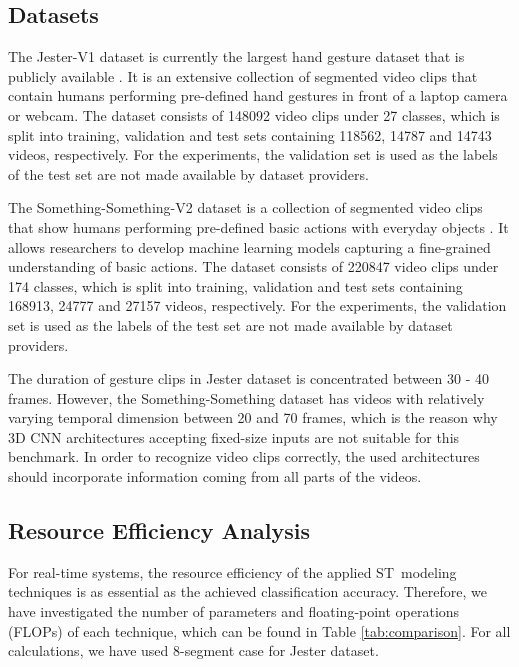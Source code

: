 \documentclass[runningheads]{llncs}
\begin{document}
\subsection{Datasets}

The Jester-V1 dataset is currently the largest hand gesture dataset that is publicly available \cite{jester}. It is an extensive collection of segmented video clips that contain humans performing pre-defined hand gestures in front of a laptop camera or webcam. The dataset consists of 148092 video clips under 27 classes, which is split into training, validation and test sets containing 118562, 14787 and 14743 videos, respectively. For the experiments, the validation set is used as the labels of the test set are not made available by dataset providers.

The Something-Something-V2 dataset is a collection of segmented video clips that show humans performing pre-defined basic actions with everyday objects \cite{Goyal_undated-kx}. It allows researchers to develop machine learning models capturing a fine-grained understanding of basic actions. The dataset consists of 220847 video clips under 174 classes, which is split into training, validation and test sets containing 168913, 24777 and 27157 videos, respectively. For the experiments, the validation set is used as the labels of the test set are not made available by dataset providers.

The duration of gesture clips in Jester dataset is concentrated between 30 - 40 frames. However, the Something-Something dataset has videos with relatively varying temporal dimension between 20 and 70 frames, which is the reason why 3D CNN architectures accepting fixed-size inputs are not suitable for this benchmark. In order to recognize video clips correctly, the used architectures should incorporate information coming from all parts of the videos.


\subsection{Resource Efficiency Analysis}

For real-time systems, the resource efficiency of the applied ST~modeling techniques is as essential as the achieved classification accuracy. Therefore, we have investigated the number of parameters and floating-point operations (FLOPs) of each technique, which can be found in Table \ref{tab:comparison}. For all calculations, we have used 8-segment case for Jester dataset. 
\end{document}
